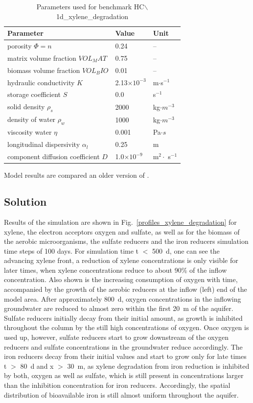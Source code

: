 \begin{table}[htbp]
\caption{Parameters used for benchmark HC$\backslash$1d\_xylene\_degradation }
\centering
\begin{tabular}{|l|l|l|}
\hline
Parameter & Value & Unit \\
\hline
porosity $\Phi = n $  & 0.24 &  --  \\			
matrix volume fraction $VOL_MAT $  & 0.75 &  --  \\			
biomass volume fraction $VOL_BIO $  & 0.01 &  --  \\			
hydraulic conductivity $K$ & 2.13$\times 10^{-3}$ & m$\cdot$s$^{-1}$ \\
storage coefficient $S$ & 0.0 & s$^{-1}$ \\
solid density $\rho_s$ & 2000 &  kg$\cdot m^{-3}$ \\
density of water $\rho_w$ & 1000 & kg$\cdot m^{-3}$ \\
viscosity water $\eta$ & 0.001 & Pa$\cdot s$ \\
longitudinal dispersivity $\alpha_l$ & 0.25 & m \\
component diffusion coefficient $D$ & 1.0$\times 10^{-9}$ & m$^2 \cdot$ s$^{-1}$ \\
\hline
\end{tabular}
\label{l_tab_benchmark_1d_xylene}
\end{table}

Model results are compared an older version of \GeoSys.

\subsection{Solution}

Results of the simulation are shown in Fig.~\ref{profiles_xylene_degradation} for xylene, the electron acceptors oxygen and sulfate, as well as for the biomass of the aerobic microorganisms, the sulfate reducers and the iron reducers simulation time steps of 100 days.
For simulation time t $<$ 500~d, one can see the advancing xylene front, a reduction of xylene concentrations is only visible for later times, when xylene concentrations reduce to about 90\% of the inflow concentration. Also shown is the increasing consumption of oxygen with time, accompanied by the growth of the aerobic reducers at the inflow (left) end of the model area. After approximately 800~d, oxygen concentrations in the inflowing groundwater are reduced to almost zero within the first 20~m of the aquifer. Sulfate reducers initially decay from their initial amount, as growth is inhibited throughout the column by the still high concentrations of oxygen. Once oxygen is used up, however, sulfate reducers start to grow downstream of the oxygen reducers and sulfate concentrations in the groundwater reduce accordingly. The iron reducers decay from their initial values and start to grow only for late times t $>$ 80~d and x $>$ 30~m, as xylene degradation from iron reduction is inhibited by both, oxygen as well as sulfate, which is still present in concentrations larger than the inhibition concentration for iron reducers. Accordingly, the spatial distribution of bioavailable iron is still almost uniform throughout the aquifer.


